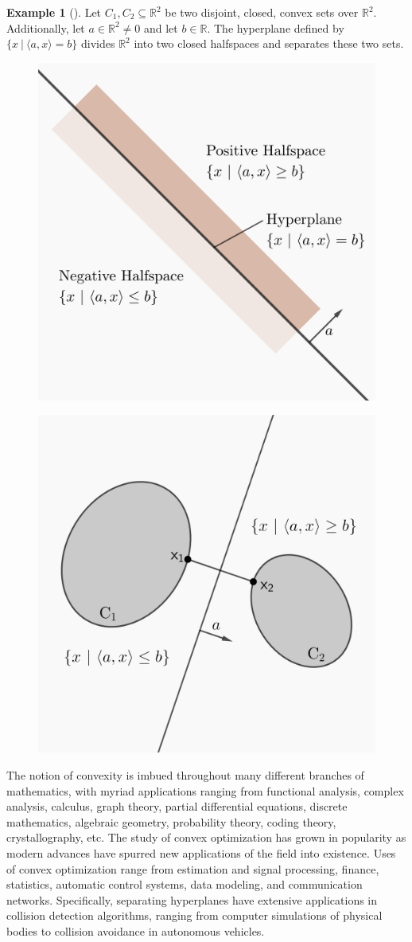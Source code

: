 \documentclass[11pt,reqno]{amsart}
\newcommand{\R}{\mathbb{R}}
\theoremstyle{plain}
\theoremstyle{definition}
\newtheorem{example}[theorem]{Example}
\begin{document}
\begin{example}[{\cite[1.5.1]{bertsekas2009convex}}]
    Let $C_1,C_2\subseteq\R^2$ be two disjoint, closed, convex sets over $\R^2$. Additionally, let $a\in\R^2\neq 0$ and let $b\in\R$. The hyperplane defined by $\{x\ |\ \langle a,x\rangle = b\}$ divides $\R^2$ into two closed halfspaces and separates these two sets.
\begin{figure}[h]
\centering
\begin{minipage}{.5\textwidth}
  \centering
  \includegraphics[height = 1.7 in]{halfspaces.png}
  \label{fig:test1}
\end{minipage}%
\begin{minipage}{.5\textwidth}
  \centering
  \includegraphics[height = 1.7 in]{separating hyperplane.png}
  \label{fig:test2}
\end{minipage}
\end{figure}
\end{example}
The notion of convexity is imbued throughout many different branches of mathematics, with myriad applications ranging from functional analysis, complex analysis, calculus, graph theory, partial differential equations, discrete mathematics, algebraic geometry, probability theory, coding theory, crystallography, etc. The study of convex optimization has grown in popularity as modern advances have spurred new applications of the field into existence. Uses of convex optimization range from estimation and signal processing, finance, statistics, automatic control systems, data modeling, and communication networks.\cite{boyd_vandenberghe_2004}  Specifically, separating hyperplanes have extensive applications in collision detection algorithms, ranging from computer simulations of physical bodies to collision avoidance in autonomous vehicles.\cite{mercy}
\end{document}
